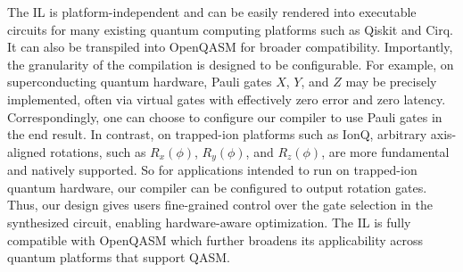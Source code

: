 \documentclass[conference]{IEEEtran}
\begin{document}
    The IL is platform-independent and can be easily rendered into executable circuits for many existing quantum computing platforms such as Qiskit and Cirq.
    It can also be transpiled into OpenQASM for broader compatibility.
    Importantly, the granularity of the compilation is designed to be configurable.
    For example, on superconducting quantum hardware, Pauli gates $X$, $Y$, and $Z$ may be precisely implemented, often via virtual gates with effectively zero error and zero latency.
    Correspondingly, one can choose to configure our compiler to use Pauli gates in the end result.
    In contrast, on trapped-ion platforms such as IonQ, arbitrary axis-aligned rotations, such as $R_x(\phi)$, $R_y(\phi)$, and $R_z(\phi)$, are more fundamental and natively supported.
    So for applications intended to run on trapped-ion quantum hardware, our compiler can be configured to output rotation gates.
    Thus, our design gives users fine-grained control over the gate selection in the synthesized circuit, enabling hardware-aware optimization.
    The IL is fully compatible with OpenQASM which further broadens its applicability across quantum platforms that support QASM\@.
\end{document}
